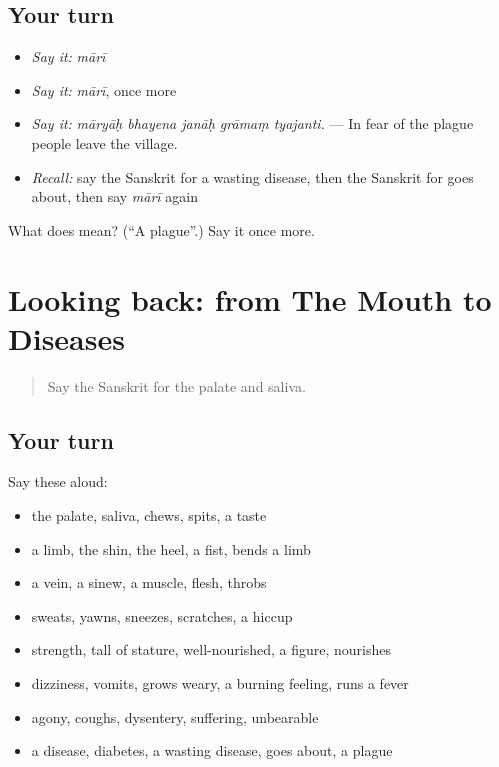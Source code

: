 \subsection*{Your turn}
\begin{itemize}
\raggedright
  \item \emph{Say it:} \emph{mārī}
  \item \emph{Say it:} \emph{mārī}, once more
  \item \emph{Say it:} \emph{māryāḥ bhayena janāḥ grāmaṃ tyajanti.} — In fear of the plague people leave the village.
  \item \emph{Recall:} say the Sanskrit for a wasting disease, then the Sanskrit for goes about, then say \emph{mārī} again
\end{itemize}

\begin{tcolorbox}[breakable,colback=teal!4,colframe=teal!35!black,title={Before you move on}]
What does  mean? (\textquotedblleft{}A plague\textquotedblright{}.) Say it once more.
\end{tcolorbox}
\section[(dialogue)]{Looking back: from The Mouth to Diseases}

\label{lesson:SA-R479-review-472-479}



\begin{quote}
Say the Sanskrit for the palate and saliva.
\end{quote}

\subsection*{Your turn}
Say these aloud:

\begin{itemize}
\raggedright
  \item the palate, saliva, chews, spits, a taste
  \item a limb, the shin, the heel, a fist, bends a limb
  \item a vein, a sinew, a muscle, flesh, throbs
  \item sweats, yawns, sneezes, scratches, a hiccup
  \item strength, tall of stature, well-nourished, a figure, nourishes
  \item dizziness, vomits, grows weary, a burning feeling, runs a fever
  \item agony, coughs, dysentery, suffering, unbearable
  \item a disease, diabetes, a wasting disease, goes about, a plague
\end{itemize}


